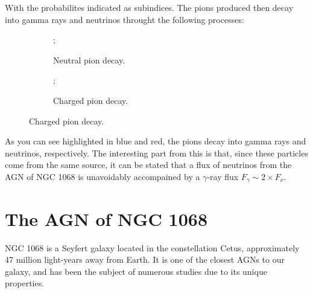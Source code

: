 With the probabilites indicated as subindices. The pions produced then decay into gamma rays and neutrinos throught the following processes:
\vspace{-0.275cm}
\begin{figure}[H]
    \centering
    \begin{subfigure}{0.45\textwidth}
        \centering
        ;
        \caption{Neutral pion decay.}
    \end{subfigure}
    \begin{subfigure}{0.45\textwidth}
        \centering
        ;
        \caption{Charged pion decay.}
    \end{subfigure}
  \end{figure}

As you can see highlighted in blue and red, the pions decay into gamma rays and neutrinos, respectively.
The interesting part from this is that, since these particles come from the same source, it can be stated that a flux of neutrinos from the AGN of NGC 1068 is unavoidably accompained by a $\gamma$-ray flux $F_\gamma \sim 2 \times F_\nu$.

\section{The AGN of NGC 1068}

NGC 1068 is a Seyfert galaxy located in the constellation Cetus, approximately 47 million light-years away from Earth. It is one of the closest AGNs to our galaxy, and has been the subject of numerous studies due to its unique properties.

